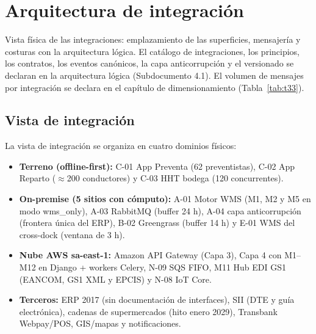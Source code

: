 
\chapter{Arquitectura de integración}
\label{sec:h-arquitectura-de-integracion}

Vista física de las integraciones: emplazamiento de las superficies, mensajería y costuras con la arquitectura lógica. El catálogo de integraciones, los principios, los contratos, los eventos canónicos, la capa anticorrupción y el versionado se declaran en la arquitectura lógica (Subdocumento 4.1). El volumen de mensajes por integración se declara en el capítulo de dimensionamiento (Tabla~\ref{tab:t33}).

\section{Vista de integración}
\label{sub:2-vista-de-integracion}

La vista de integración se organiza en cuatro dominios físicos:

\begin{itemize}
  \item \textbf{Terreno (offline-first):} C-01 App Preventa (62 preventistas), C-02 App Reparto ($\approx$200 conductores) y C-03 HHT bodega (120 concurrentes).
  \item \textbf{On-premise (5 sitios con cómputo):} A-01 Motor WMS (M1, M2 y M5 en modo wms\_only), A-03 RabbitMQ (buffer 24 h), A-04 capa anticorrupción (frontera única del ERP), B-02 Greengrass (buffer 14 h) y E-01 WMS del cross-dock (ventana de 3 h).
  \item \textbf{Nube AWS sa-east-1:} Amazon API Gateway (Capa 3), Capa 4 con M1--M12 en Django + workers Celery, N-09 SQS FIFO, M11 Hub EDI GS1 (EANCOM, GS1 XML y EPCIS) y N-08 IoT Core.
  \item \textbf{Terceros:} ERP 2017 (sin documentación de interfaces), SII (DTE y guía electrónica), cadenas de supermercados (hito enero 2029), Transbank Webpay/POS, GIS/mapas y notificaciones.
\end{itemize}

